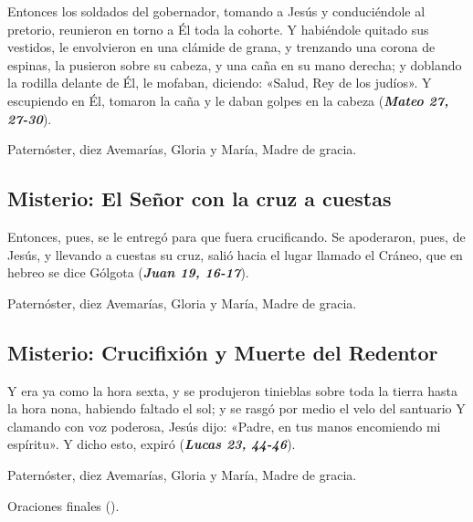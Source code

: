 \documentclass[./rosary.tex]{subfiles}
\newcounter{sorrowful-counter}
\begin{document}
Entonces los soldados del gobernador, tomando a Jesús y conduciéndole al pretorio,
reunieron en torno a Él toda la cohorte. Y habiéndole quitado sus vestidos, le envolvieron en una clámide de grana,
y trenzando una corona de espinas, la pusieron sobre su cabeza, y una caña en su mano derecha;
y doblando la rodilla delante de Él, le mofaban, diciendo: «Salud, Rey de los judíos».
Y escupiendo en Él, tomaron la caña y le daban golpes en la cabeza (\textbf{\emph{Mateo 27, 27-30}}).

\begin{center}
      Paternóster, diez Avemarías, Gloria y María, Madre de gracia.
\end{center}

\subsection*{ Misterio: El Señor con la cruz a cuestas}

Entonces, pues, se le entregó para que fuera crucificando. Se apoderaron, pues, de Jesús,
y llevando a cuestas su cruz, salió hacia el lugar llamado el Cráneo, que en hebreo se dice Gólgota (\textbf{\emph{Juan 19, 16-17}}).

\begin{center}
      Paternóster, diez Avemarías, Gloria y María, Madre de gracia.
\end{center}

\subsection*{ Misterio: Crucifixión y Muerte del Redentor}

Y era ya como la hora sexta, y se produjeron tinieblas sobre toda la tierra hasta la hora nona,
habiendo faltado el sol; y se rasgó por medio el velo del santuario Y clamando con voz poderosa,
Jesús dijo: «Padre, en tus manos encomiendo mi espíritu». Y dicho esto, expiró (\textbf{\emph{Lucas 23, 44-46}}).

\begin{center}
      Paternóster, diez Avemarías, Gloria y María, Madre de gracia.
      
      Oraciones finales ().
\end{center}
\end{document}
